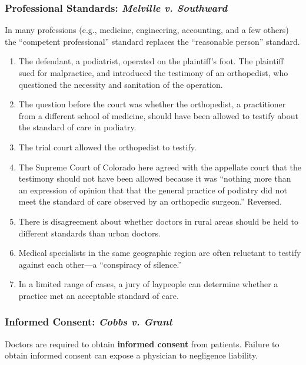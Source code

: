 \subsubsection{Professional Standards: \emph{Melville v. Southward}}

In many professions (e.g., medicine, engineering, accounting, and a few 
others) the ``competent professional'' standard replaces the ``reasonable 
person'' standard.

\begin{enumerate}
    \item The defendant, a podiatrist, operated on the plaintiff's foot. The 
    plaintiff sued for malpractice, and introduced the testimony of an 
    orthopedist, who questioned the necessity and sanitation of the operation.  
    \item The question before the court was whether the orthopedist, a 
    practitioner from a different school of medicine, should have been allowed 
    to testify about the standard of care in podiatry.
    \item The trial court allowed the orthopedist to testify.
    \item The Supreme Court of Colorado here agreed with the appellate court 
    that the testimony should not have been allowed because it was ``nothing 
    more than an expression of opinion that that the general practice of 
    podiatry did not meet the standard of care observed by an orthopedic 
    surgeon.'' Reversed.
    \item There is disagreement about whether doctors in rural areas should be 
    held to different standards than urban doctors.
    \item Medical specialists in the same geographic region are often 
    reluctant to testify against each other---a ``conspiracy of silence.''
    \item In a limited range of cases, a jury of laypeople can determine 
    whether a practice met an acceptable standard of care.
\end{enumerate}

\subsubsection{Informed Consent: \emph{Cobbs v. Grant}}

Doctors are required to obtain \textbf{informed consent} from patients.  
Failure to obtain informed consent can expose a physician to negligence 
liability.

